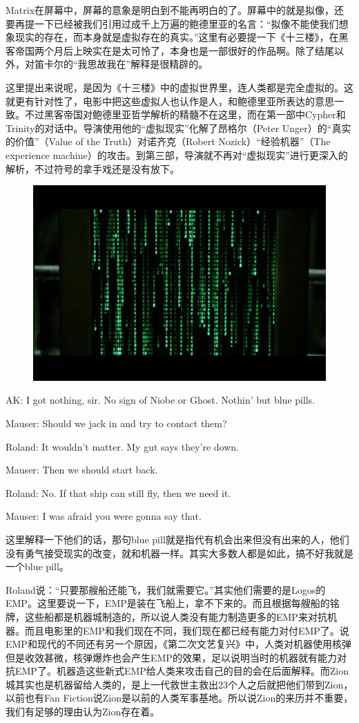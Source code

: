 \documentclass[UTF8]{ctexart}
\newenvironment{myquote}{\color{green} \setlength{\leftskip}{6em} \setlength{\rightskip}{4em} \setlength{\parindent}{-2em}}{\par}
\begin{document}
Matrix在屏幕中，屏幕的意象是明白到不能再明白的了。屏幕中的就是拟像，还要再提一下已经被我们引用过成千上万遍的鲍德里亚的名言：“拟像不能使我们想象现实的存在，而本身就是虚拟存在的真实。”这里有必要提一下《十三楼》，在黑客帝国两个月后上映实在是太可怜了，本身也是一部很好的作品啊。除了结尾以外，对笛卡尔的“我思故我在”解释是很精辟的。

这里提出来说呢，是因为《十三楼》中的虚拟世界里，连人类都是完全虚拟的。这就更有针对性了，电影中把这些虚拟人也认作是人，和鲍德里亚所表达的意思一致。不过黑客帝国对鲍德里亚哲学解析的精髓不在这里，而在第一部中Cypher和Trinity的对话中。导演使用他的“虚拟现实”化解了昂格尔（Peter Unger）的“真实的价值”（Value of the Truth）对诺齐克（Robert Nozick）“经验机器”（The experience machine）的攻击。到第三部，导演就不再对“虚拟现实”进行更深入的解析，不过符号的拿手戏还是没有放下。

\begin{figure}[htb]
\centering
\includegraphics[width=0.5\linewidth]{fig/a698838bba0ca1d3fd1f1010.jpg}
\end{figure}

\begin{myquote}
AK: I got nothing, sir. No sign of Niobe or Ghost. Nothin' but blue pills.

Mauser: Should we jack in and try to contact them?

Roland: It wouldn't matter. My gut says they're down.

Mauser: Then we should start back.

Roland: No. If that ship can still fly, then we need it.

Mauser: I was afraid you were gonna say that.
\end{myquote}

这里解释一下他们的话，那句blue pill就是指代有机会出来但没有出来的人，他们没有勇气接受现实的改变，就和机器一样。其实大多数人都是如此，搞不好我就是一个blue pill。

Roland说：“只要那艘船还能飞，我们就需要它。”其实他们需要的是Logos的EMP。这里要说一下，EMP是装在飞船上，拿不下来的。而且根据每艘船的铭牌，这些船都是机器城制造的，所以说人类没有能力制造更多的EMP来对抗机器。而且电影里的EMP和我们现在不同，我们现在都已经有能力对付EMP了。说EMP和现代的不同还有另一个原因，《第二次文艺复兴》中，人类对机器使用核弹但是收效甚微，核弹爆炸也会产生EMP的效果，足以说明当时的机器就有能力对抗EMP了。机器造这些新式EMP给人类来攻击自己的目的会在后面解释。而Zion城其实也是机器留给人类的，是上一代救世主救出23个人之后就把他们带到Zion，以前也有Fan Fiction说Zion是以前的人类军事基地。所以说Zion的来历并不重要，我们有足够的理由认为Zion存在着。
\end{document}
